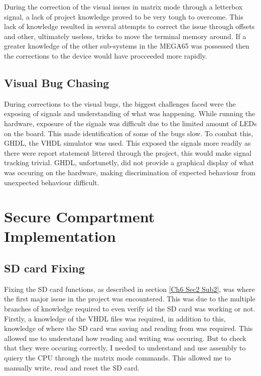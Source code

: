 During the correction of the visual issues in matrix mode through a letterbox signal, a lack of project knowledge proved to be very tough to overcome. This lack of knowledge resulted in several attempts to correct the issue through offsets and other, ultimately useless, tricks to move the terminal memory around. If a greater knowledge of the other sub-systems in the MEGA65 was possessed then the corrections to the device would have procceeded more rapidly.

\subsection{Visual Bug Chasing}

\label{Ch7 Sec1 Sub4}

During corrections to the visual bugs, the biggest challenges faced were the exposing of signals and understanding of what was happening. While running the hardware, exposure of the signals was difficult due to the limited amount of LEDs on the board. This made identification of some of the bugs slow. To combat this, GHDL, the VHDL simulator was used. This exposed the signals more readily as there were report statement littered through the project, this would make signal tracking trivial. GHDL, unfortunetly, did not provide a graphical display of what was occuring on the hardware, making discrimination of expected behaviour from unexpected behaviour difficult.


\section{Secure Compartment Implementation}

\label{Ch7 Sec2}

\subsection{SD card Fixing}

\label{Ch7 Sec2 Sub1}

Fixing the SD card functions, as described in section \ref{Ch6 Sec2 Sub2}, was where the first major issue in the project was encountered. This was due to the multiple branches of knowledge required to even verify id the SD card was working or not. Firstly, a knowledge of the VHDL files was required, in addition to this, knowledge of where the SD card was saving and reading from was required. This allowed me to understand how reading and writing was occuring. But to check that they were occuring correctly, I needed to understand and use assembly to quiery the CPU through the matrix mode commands. This allowed me to manually write, read and reset the SD card.

